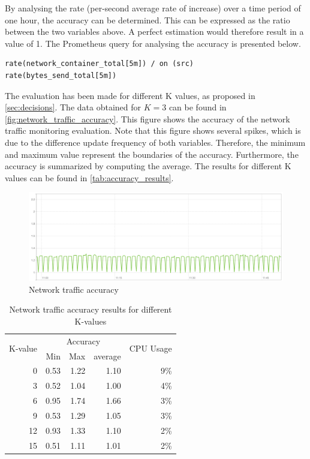 \noindent
By analysing the rate (per-second average rate of increase) over a time period of one hour, the accuracy can be determined. This can be expressed as the ratio between the two variables above. A perfect estimation would therefore result in a value of 1. The Prometheus query for analysing the accuracy is presented below.

\begin{verbatim}
rate(network_container_total[5m]) / on (src) 
rate(bytes_send_total[5m])
\end{verbatim}

\noindent
The evaluation has been made for different K values, as proposed in \autoref{sec:decisions}. The data obtained for $K = 3$ can be found in \autoref{fig:network_traffic_accuracy}. This figure shows the accuracy of the network traffic monitoring evaluation. Note that this figure shows several spikes, which is due to the difference update frequency of 
both variables. Therefore, the minimum and maximum value represent the boundaries of the accuracy. Furthermore, the accuracy is summarized by computing the average. The results for different K values can be found in \autoref{tab:accuracy_results}.

\begin{figure}
    \centering
    \includegraphics[width=\textwidth]{gfx/traffic_network_accuracy}
    \caption{Network traffic accuracy}
    \label{fig:network_traffic_accuracy}
\end{figure}

\begin{table}[ht]
    \centering
    \begin{tabular}{r|rrr|r}
        \multirow{2}{*}{K-value} & \multicolumn{3}{|c|}{Accuracy} & \multirow{2}{*}{CPU Usage} \\
        & Min & Max & average & \\ \hline        
        0 & 0.53& 1.22& 1.10& 9\% \\
        3 & 0.52& 1.04& 1.00& 4\% \\
        6 & 0.95& 1.74& 1.66& 3\% \\
        9 & 0.53& 1.29& 1.05& 3\% \\
        12& 0.93& 1.33& 1.10& 2\% \\
        15& 0.51& 1.11& 1.01& 2\% \\        
    \end{tabular}
    \caption{Network traffic accuracy results for different K-values}
    \label{tab:accuracy_results}
\end{table}


